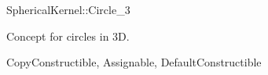 
\begin{ccRefConcept}{SphericalKernel::Circle_3}

Concept for circles in 3D.

\ccRefines
CopyConstructible, Assignable, DefaultConstructible

\ccHasModels
{}
\end{ccRefConcept}
